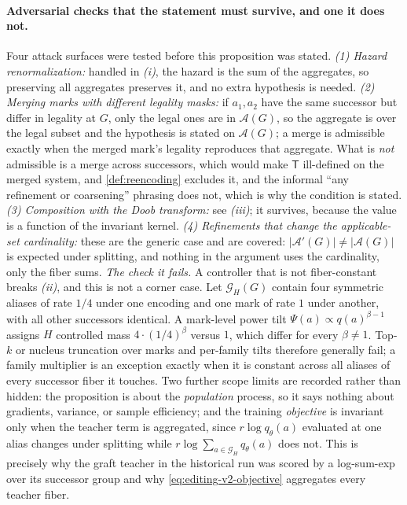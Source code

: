 \documentclass{article}
\newcommand{\A}{\mathcal{A}}
\newcommand{\T}{\mathsf{T}}
\newcommand{\Gset}{\mathcal{G}}
\theoremstyle{definition}
\theoremstyle{remark}
\begin{document}
\paragraph{Adversarial checks that the statement must survive, and one it does not.}
Four attack surfaces were tested before this proposition was stated.
\emph{(1) Hazard renormalization:} handled in \emph{(i)}, the hazard is the sum of the aggregates, so preserving all aggregates preserves it, and no extra hypothesis is needed.
\emph{(2) Merging marks with different legality masks:} if $a_1,a_2$ have the same successor but differ in legality at $G$, only the legal ones are in $\A(G)$, so the aggregate is over the legal subset and the hypothesis is stated on $\A(G)$; a merge is admissible exactly when the merged mark's legality reproduces that aggregate. What is \emph{not} admissible is a merge across successors, which would make $\T$ ill-defined on the merged system, and \cref{def:reencoding} excludes it, and the informal ``any refinement or coarsening'' phrasing does not, which is why the condition is stated.
\emph{(3) Composition with the Doob transform:} see \emph{(iii)}; it survives, because the value is a function of the invariant kernel.
\emph{(4) Refinements that change the applicable-set cardinality:} these are the generic case and are covered: $|\A'(G)|\neq|\A(G)|$ is expected under splitting, and nothing in the argument uses the cardinality, only the fiber sums.
\emph{The check it fails.} A controller that is not fiber-constant breaks \emph{(ii)}, and this is not a corner case. Let $\Gset_H(G)$ contain four symmetric aliases of rate $1/4$ under one encoding and one mark of rate $1$ under another, with all other successors identical. A mark-level power tilt $\Psi(a)\propto q(a)^{\beta-1}$ assigns $H$ controlled mass $4\cdot(1/4)^{\beta}$ versus $1$, which differ for every $\beta\neq1$. Top-$k$ or nucleus truncation over marks and per-family tilts therefore generally fail; a family multiplier is an exception exactly when it is constant across all aliases of every successor fiber it touches. Two further scope limits are recorded rather than hidden: the proposition is about the \emph{population} process, so it says nothing about gradients, variance, or sample efficiency; and the training \emph{objective} is invariant only when the teacher term is aggregated, since $r\log q_\theta(a)$ evaluated at one alias changes under splitting while $r\log\sum_{a\in\Gset_H}q_\theta(a)$ does not. This is precisely why the graft teacher in the historical run was scored by a log-sum-exp over its successor group and why \eqref{eq:editing-v2-objective} aggregates every teacher fiber.
\end{document}
